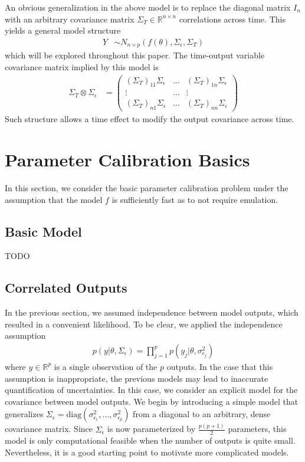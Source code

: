 \documentclass[12pt]{article}
\newcommand{\R}{\mathbb{R}}
\begin{document}
An obvious generalization in the above model is to replace the diagonal matrix $I_n$ with an arbitrary covariance matrix $\Sigma_T \in \R^{n \times n}$ correlations across time. 
This yields a general model structure 
\begin{align}
Y &\sim N_{n \times p}(f(\theta), \Sigma_\epsilon, \Sigma_T)
\end{align}
which will be explored throughout this paper. The time-output variable covariance matrix implied by this model is
\begin{align}
\Sigma_T \otimes \Sigma_\epsilon &= \begin{pmatrix} (\Sigma_T)_{11}\Sigma_\epsilon & \hdots & (\Sigma_T)_{1n}\Sigma_\epsilon \\
										   \vdots & \hdots & \vdots \\
										   (\Sigma_T)_{n1}\Sigma_\epsilon & \hdots & (\Sigma_T)_{nn}\Sigma_\epsilon \end{pmatrix}
\end{align}
Such structure allows a time effect to modify the output covariance across time.  


\section{Parameter Calibration Basics}
In this section, we consider the basic parameter calibration problem under the assumption that the model $f$ is sufficiently fast as to not require emulation. 

\subsection{Basic Model}
TODO

\subsection{Correlated Outputs} \label{corr_outputs}
In the previous section, we assumed independence between model outputs, which resulted in a convenient likelihood. To be clear, we applied the independence assumption
\begin{align}
p(y|\theta, \Sigma_\epsilon) = \prod_{j = 1}^{p} p(y_j|\theta, \sigma_{\epsilon_j}^2)
\end{align}
where $y \in \R^p$ is a single observation of the $p$ outputs. In the case that this assumption is inappropriate, the previous models may lead to inaccurate 
quantification of uncertainties. In this case, we consider an explicit model for the covariance between model outputs. We begin by introducing a simple model 
that generalizes $\Sigma_\epsilon = \text{diag}\left(\sigma_{\epsilon_1}^2, \dots, \sigma_{\epsilon_p}^2\right)$ from a diagonal to an arbitrary, dense covariance 
matrix. Since $\Sigma_\epsilon$ is now parameterized by $\frac{p(p+1)}{2}$ parameters, this model is only computational feasible when the number of outputs is 
quite small. Nevertheless, it is a good starting point to motivate more complicated models. 
\end{document}
